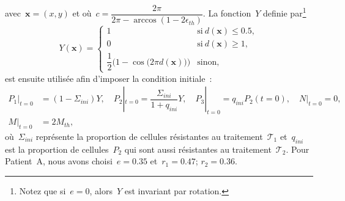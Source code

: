 \documentclass[11pt]{amsart}
\numberwithin{equation}{section}
\newcommand{\TI}{{\mathcal T_1}}
\newcommand{\TS}{{\mathcal T_2}}
\newcommand{\Ms}{M_{th}}
\newcommand{\vecx}{\mathbf{x}}
\newcommand{\Nber}{Patient~A\xspace}
\begin{document}
avec~$\vecx=(x,y)$ et où~$c=\dfrac{2\pi}{2\pi-\arccos(1-2\epsilon_{th})}$. 
La fonction~$Y$ definie par\footnote{Notez que si~$e=0$, alors~$Y$ est  invariant par rotation.}
\begin{equation}Y(\vecx)=\left\{
\begin{array}{ll}
1 & \textrm{si}\ d(\vecx)\leq 0.5,\\
0 & \textrm{si}\ d(\vecx)\geq 1, \\
\dfrac{1}{2}\Big(1-\cos \big(2\pi d(\vecx)\big)\Big)& \textrm{sinon},
\label{eq:CI_forme}
\end{array}\right.
\end{equation}
est ensuite utilisée afin d'imposer la condition initiale~:
\begin{equation}\label{eq:CI}
\begin{aligned}
P_1|_{t=0}&=(1-\Sigma_{ini})Y, \quad
P_2|_{t=0}=\dfrac{\Sigma_{ini}}{1+q_{ini}}Y, \quad
P_3|_{t=0}=q_{ini}P_2(t=0), \quad N|_{t=0}=0, \\
M|_{t=0}&=2\Ms,
\end{aligned}
\end{equation}
où~$\Sigma_{ini}$ représente la proportion de cellules résistantes au traitement~$\TI$ et~$q_{ini}$ est la proportion de cellules~$P_2$
qui sont aussi résistantes au traitement~$\TS$. Pour \Nber, nous avons choisi~$e=0.35$ et~$r_1=0.47$; $r_2=0.36$.
\end{document}
